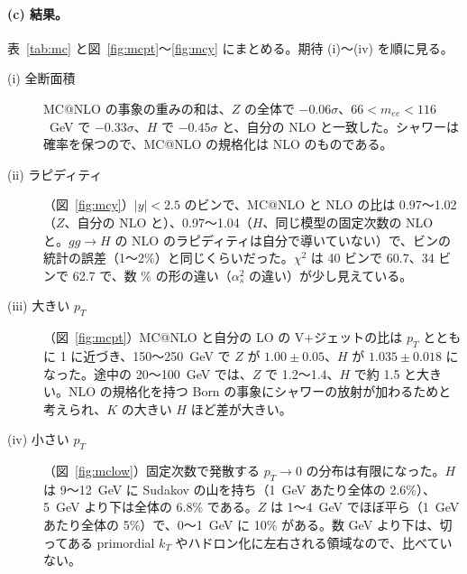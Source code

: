 \documentclass[a4paper,10pt]{ltjsarticle}
\begin{document}
\paragraph{(c) 結果。}表~\ref{tab:mc} と図~\ref{fig:mcpt}〜\ref{fig:mcy} にまとめる。期待 (i)〜(iv) を順に見る。
\begin{description}
\item[(i) 全断面積] MC@NLO の事象の重みの和は、$Z$ の全体で $-0.06\sigma$、$66<m_{ee}<116$~GeV で $-0.33\sigma$、$H$ で $-0.45\sigma$ と、自分の NLO と一致した。シャワーは確率を保つので、MC@NLO の規格化は NLO のものである。
\item[(ii) ラピディティ]（図~\ref{fig:mcy}）$|y|<2.5$ のビンで、MC@NLO と NLO の比は 0.97〜1.02（$Z$、自分の NLO と）、0.97〜1.04（$H$、同じ模型の固定次数の NLO と。$gg\to H$ の NLO のラピディティは自分で導いていない）で、ビンの統計の誤差（1〜2\%）と同じくらいだった。$\chi^2$ は 40 ビンで 60.7、34 ビンで 62.7 で、数 \% の形の違い（$\alpha_s^2$ の違い）が少し見えている。
\item[(iii) 大きい $p_T$]（図~\ref{fig:mcpt}）MC@NLO と自分の LO の V$+$ジェットの比は $p_T$ とともに 1 に近づき、150〜250~GeV で $Z$ が $1.00\pm0.05$、$H$ が $1.035\pm0.018$ になった。途中の 20〜100~GeV では、$Z$ で 1.2〜1.4、$H$ で約 1.5 と大きい。NLO の規格化を持つ Born の事象にシャワーの放射が加わるためと考えられ、$K$ の大きい $H$ ほど差が大きい。
\item[(iv) 小さい $p_T$]（図~\ref{fig:mclow}）固定次数で発散する $p_T\to0$ の分布は有限になった。$H$ は 9〜12~GeV に Sudakov の山を持ち（1~GeV あたり全体の 2.6\%）、5~GeV より下は全体の 6.8\% である。$Z$ は 1〜4~GeV でほぼ平ら（1~GeV あたり全体の 5\%）で、0〜1~GeV に 10\% がある。数 GeV より下は、切ってある primordial $k_T$ やハドロン化に左右される領域なので、比べていない。
\end{description}
\end{document}
